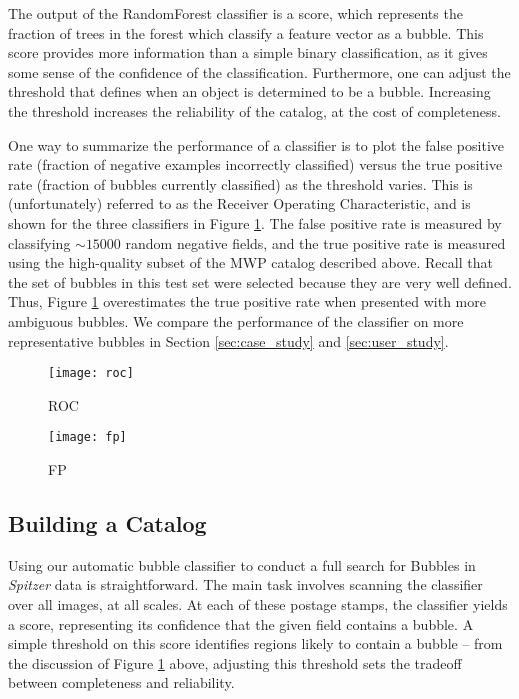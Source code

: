 \documentclass[preprint]{aastex}
\begin{document}
The output of the RandomForest classifier is a score, which represents the fraction of trees in the forest which classify a feature vector as a bubble. This score provides more information than a simple binary classification, as it gives some sense of the confidence of the classification. Furthermore, one can adjust the threshold that defines when an object is determined to be a bubble. Increasing the threshold increases the reliability of the catalog, at the cost of completeness.

One way to summarize the performance of a classifier is to plot the false positive rate (fraction of negative examples incorrectly classified) versus the true positive rate (fraction of bubbles currently classified) as the threshold varies. This is (unfortunately) referred to as the Receiver Operating Characteristic, and is shown for the three classifiers in Figure \ref{fig:roc}. The false positive rate is measured by classifying $\sim 15000$ random negative fields, and the true positive rate is measured using the high-quality subset of the MWP catalog described above. Recall that the set of bubbles in this test set were selected because they are very well defined. Thus, Figure \ref{fig:roc} overestimates the true positive rate when presented with more ambiguous bubbles. We compare the performance of the classifier on more representative bubbles in Section \ref{sec:case_study} and \ref{sec:user_study}.

\begin{figure}
\texttt{[image: roc]}
\caption{ROC}
\label{fig:roc}
\end{figure}


\begin{figure}
\texttt{[image: fp]}
\caption{FP}
\label{fig:fp}
\end{figure}


\subsection{Building a Catalog}
Using our automatic bubble classifier to conduct a full search for Bubbles in \textit{Spitzer} data is straightforward. The main task involves scanning the classifier over all images, at all scales. At each of these postage stamps, the classifier yields a score, representing its confidence that the given field contains a bubble. A simple threshold on this score identifies regions likely to contain a bubble -- from the discussion of Figure \ref{fig:roc} above, adjusting this threshold sets the tradeoff between completeness and reliability. 
\end{document}
